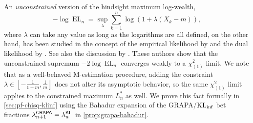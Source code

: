An \emph{unconstrained} version of the hindsight maximum log-wealth, 
\begin{equation}
-\log \operatorname{EL}_n = \sup_{\lambda} \sum_{k=1}^n \log(1+\lambda(X_k - m))    ,
\end{equation}
where $\lambda$ can take any value as long as the logarithms are all defined, on the other hand, has been studied in the concept of the empirical likelihood by \cite{owen2001empirical} and the dual likelihood by \cite{mykland1995dual}. See also the discussion by \citet[Section E.6]{waudby2024estimating}. These authors show that the unconstrained supremum $-2\log \operatorname{EL}_n$ converges weakly to a $\chi^2_{(1)}$ limit. We note that as a well-behaved M-estimation procedure, adding the constraint $\lambda \in [-\frac{1}{1-m}, \frac{1}{m}]$ does not alter its asymptotic behavior, so the same $\chi^2_{(1)}$ limit applies to the constrained maximum $L_n^*$ as well. We prove this fact formally in \cref{sec:pf-chisq-klinf} using the Bahadur expansion of the GRAPA/$\operatorname{KL}_{\inf}$ bet fractions $\lambda^{\mathsf{GRAPA}}_{n+1} = \lambda^{\mathsf{KL}}_n$ in \cref{prop:grapa-bahadur}.


